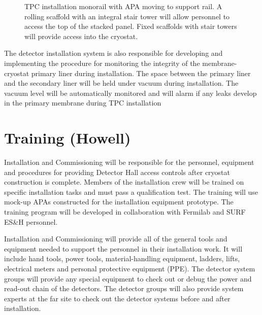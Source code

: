 
\begin{figure}[htbp]
\centering
\caption[TPC installation monorail with APA moving to support rail]{TPC installation monorail with APA moving to support rail. A rolling scaffold with an integral stair tower will allow personnel to access the top of the stacked panel. Fixed scaffolds with stair towers will provide access into the cryostat.} 
\label{fig:tpc-install-monorail}
\end{figure}

The detector installation system is also responsible for developing and implementing the procedure for monitoring the integrity of the membrane-cryostat primary liner during installation. The space between the 
primary liner and the secondary liner will be held under vacuum during installation. The vacuum level will be automatically monitored and will alarm if any leaks develop in the primary membrane during TPC installation

\section{Training (Howell)}
\label{fd:install:training}

Installation and Commissioning will be responsible for the personnel, equipment and procedures for providing Detector Hall access controls after cryostat construction is complete. Members of the installation crew will be 
trained on specific installation tasks and must pass a qualification test. The training will use mock-up APAs constructed for the installation equipment prototype. The training program will be developed in collaboration with Fermilab and SURF ES\&H personnel. 

Installation and Commissioning will provide all of the general tools and equipment needed to support the personnel in their installation work. It will include hand tools, power tools, material-handling equipment, ladders, 
lifts, electrical meters and personal protective equipment (PPE). The detector system groups will provide any special equipment to check out or debug the power and read-out chain of the detectors. The detector groups will also provide system experts at the far site to check out the detector systems before and after installation. 

